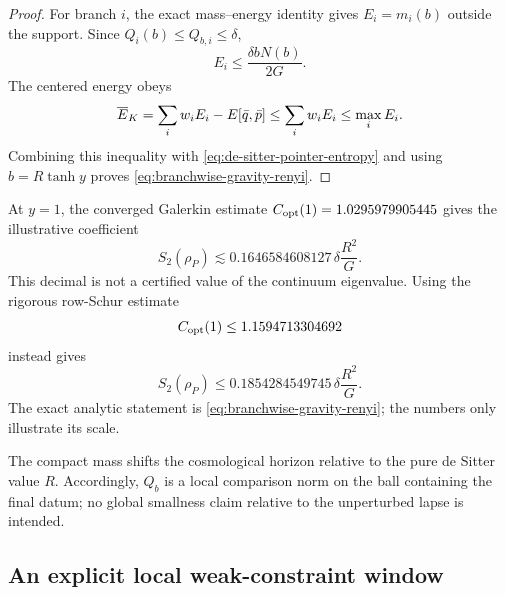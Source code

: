\begin{proof}
For branch $i$, the exact mass--energy identity gives
$E_i=m_i(b)$ outside the support.  Since
$Q_i(b)\leq Q_{b,i}\leq\delta$,
\begin{equation}
 E_i\leq\frac{\delta bN(b)}{2G}.
\end{equation}
The centered energy obeys
\begin{equation}
 \overline E_{K}=\sum_iw_iE_i-E[\bar q,\bar p]
 \leq\sum_iw_iE_i\leq\max_iE_i.
\end{equation}
Combining this inequality with \cref{eq:de-sitter-pointer-entropy} and using
$b=R\tanh y$ proves \cref{eq:branchwise-gravity-renyi}.
\end{proof}

At $y=1$, the converged Galerkin estimate
$C_{\rm opt}(1)=1.0295979905445$ gives the illustrative coefficient
\begin{equation}
 S_2(\rho_P)\lesssim
 0.1646584608127\,\delta\frac{R^2}{G}.
 \label{eq:gravity-illustrative-coefficient}
\end{equation}
This decimal is not a certified value of the continuum eigenvalue.  Using the
rigorous row-Schur estimate
\begin{equation}
 C_{\rm opt}(1)\leq1.1594713304692
\end{equation}
instead gives
\begin{equation}
 S_2(\rho_P)\leq
 0.1854284549745\,\delta\frac{R^2}{G}.
 \label{eq:gravity-rigorous-coefficient}
\end{equation}
The exact analytic statement is \cref{eq:branchwise-gravity-renyi}; the
numbers only illustrate its scale.

The compact mass shifts the cosmological horizon relative to the pure de
Sitter value $R$.  Accordingly, $Q_b$ is a local comparison norm on the ball
containing the final datum; no global smallness claim relative to the
unperturbed lapse is intended.

\subsection{An explicit local weak-constraint window}

